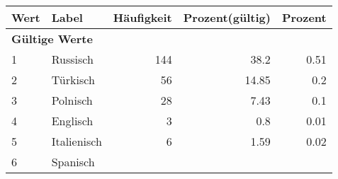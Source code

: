      \begin{longtable}{lXrrr}
     \toprule
     \textbf{Wert} & \textbf{Label} & \textbf{Häufigkeit} & \textbf{Prozent(gültig)} & \textbf{Prozent} \\
     \endhead
     \midrule
     \multicolumn{5}{l}{\textbf{Gültige Werte}}\\

     1 &
     \multicolumn{1}{X}{ Russisch   } &


       \num{144} &
       \num[round-mode=places,round-precision=2]{38,2} &
         \num[round-mode=places,round-precision=2]{0,51} \\

     2 &
     \multicolumn{1}{X}{ Türkisch   } &


       \num{56} &
       \num[round-mode=places,round-precision=2]{14,85} &
         \num[round-mode=places,round-precision=2]{0,2} \\

     3 &
     \multicolumn{1}{X}{ Polnisch   } &


       \num{28} &
       \num[round-mode=places,round-precision=2]{7,43} &
         \num[round-mode=places,round-precision=2]{0,1} \\

     4 &
     \multicolumn{1}{X}{ Englisch   } &


       \num{3} &
       \num[round-mode=places,round-precision=2]{0,8} &
         \num[round-mode=places,round-precision=2]{0,01} \\

     5 &
     \multicolumn{1}{X}{ Italienisch   } &


       \num{6} &
       \num[round-mode=places,round-precision=2]{1,59} &
         \num[round-mode=places,round-precision=2]{0,02} \\

     6 &
     \multicolumn{1}{X}{ Spanisch   } &



\end{longtable}
